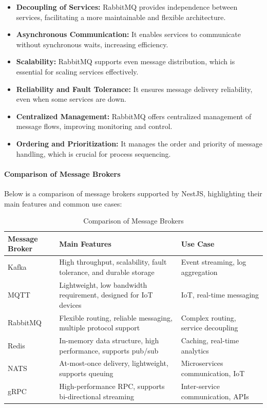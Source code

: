 \begin{itemize}
    \item \textbf{Decoupling of Services:} RabbitMQ provides independence between services, facilitating a more maintainable and flexible architecture.
    \item \textbf{Asynchronous Communication:} It enables services to communicate without synchronous waits, increasing efficiency.
    \item \textbf{Scalability:} RabbitMQ supports even message distribution, which is essential for scaling services effectively.
    \item \textbf{Reliability and Fault Tolerance:} It ensures message delivery reliability, even when some services are down.
    \item \textbf{Centralized Management:} RabbitMQ offers centralized management of message flows, improving monitoring and control.
    \item \textbf{Ordering and Prioritization:} It manages the order and priority of message handling, which is crucial for process sequencing.
\end{itemize}

\paragraph*{Comparison of Message Brokers}
Below is a comparison of message brokers supported by NestJS, highlighting their main features and common use cases:

\begin{table}[H]
\centering
\caption{Comparison of Message Brokers}
\label{tab:message_brokers_comparison}
\begin{tabular}{|l|p{6cm}|p{5cm}|}
\hline
\textbf{Message Broker} & \textbf{Main Features} & \textbf{Use Case} \\
\hline
Kafka & High throughput, scalability, fault tolerance, and durable storage & Event streaming, log aggregation \\
\hline
MQTT & Lightweight, low bandwidth requirement, designed for IoT devices & IoT, real-time messaging \\
\hline
RabbitMQ & Flexible routing, reliable messaging, multiple protocol support & Complex routing, service decoupling \\
\hline
Redis & In-memory data structure, high performance, supports pub/sub & Caching, real-time analytics \\
\hline
NATS & At-most-once delivery, lightweight, supports queuing & Microservices communication, IoT \\
\hline
gRPC & High-performance RPC, supports bi-directional streaming & Inter-service communication, APIs \\
\hline
\end{tabular}
\end{table}


